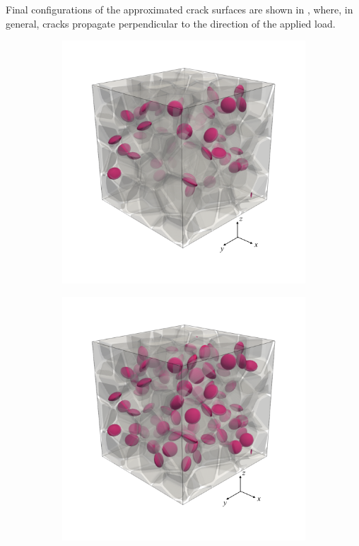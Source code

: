 Final configurations of the approximated crack surfaces are shown in , where, in general, cracks propagate perpendicular to the direction of the applied load.
\begin{figure}[!htb]
  \centering
  \begin{subfigure}{0.32\textwidth}
    \centering
    \includegraphics[width=\textwidth]{Chapter3/figures/b50_ini_new}
    \caption{}
    \label{b50_ini}
  \end{subfigure}
  \begin{subfigure}{0.32\textwidth}
    \centering
    \includegraphics[width=\textwidth]{Chapter3/figures/b100_ini_new}

\end{subfigure}
\end{figure}
